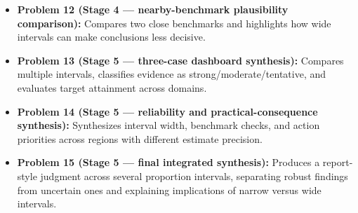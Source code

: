 \begin{itemize}
    \item \textbf{Problem 12 (Stage 4 --- nearby-benchmark plausibility comparison):} Compares two close benchmarks and highlights how wide intervals can make conclusions less decisive.
    \item \textbf{Problem 13 (Stage 5 --- three-case dashboard synthesis):} Compares multiple intervals, classifies evidence as strong/moderate/tentative, and evaluates target attainment across domains.
    \item \textbf{Problem 14 (Stage 5 --- reliability and practical-consequence synthesis):} Synthesizes interval width, benchmark checks, and action priorities across regions with different estimate precision.
    \item \textbf{Problem 15 (Stage 5 --- final integrated synthesis):} Produces a report-style judgment across several proportion intervals, separating robust findings from uncertain ones and explaining implications of narrow versus wide intervals.
\end{itemize}


